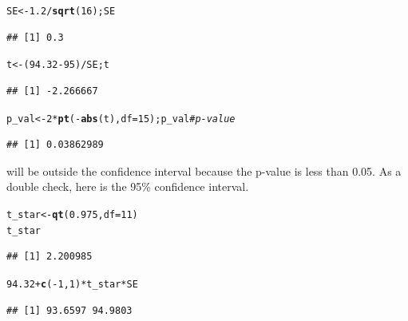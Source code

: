 \documentclass[twoside]{book}\usepackage[]{graphicx}\usepackage[]{xcolor}
\makeatletter
\newcommand{\hlnum}[1]{\textcolor[rgb]{0.686,0.059,0.569}{#1}}%
\newcommand{\hlcom}[1]{\textcolor[rgb]{0.678,0.584,0.686}{\textit{#1}}}%
\newcommand{\hlopt}[1]{\textcolor[rgb]{0,0,0}{#1}}%
\newcommand{\hlstd}[1]{\textcolor[rgb]{0.345,0.345,0.345}{#1}}%
\newcommand{\hlkwb}[1]{\textcolor[rgb]{0.69,0.353,0.396}{#1}}%
\newcommand{\hlkwc}[1]{\textcolor[rgb]{0.333,0.667,0.333}{#1}}%
\newcommand{\hlkwd}[1]{\textcolor[rgb]{0.737,0.353,0.396}{\textbf{#1}}}%
\newenvironment{kframe}{%
 \def\at@end@of@kframe{}%
 \ifinner\ifhmode%
  \def\at@end@of@kframe{\end{minipage}}%
  \begin{minipage}{\columnwidth}%
 \fi\fi%
 \def\FrameCommand##1{\hskip\@totalleftmargin \hskip-\fboxsep
 \colorbox{shadecolor}{##1}\hskip-\fboxsep
     \hskip-\linewidth \hskip-\@totalleftmargin \hskip\columnwidth}%
 \MakeFramed {\advance\hsize-\width
   \@totalleftmargin\z@ \linewidth\hsize
   \@setminipage}}%
 {\par\unskip\endMakeFramed%
 \at@end@of@kframe}
\newenvironment{knitrout}{}{} %
\makeatother
\begin{document}
\begin{solution}
\begin{knitrout}
\color{fgcolor}\begin{kframe}
\begin{alltt}
\hlstd{SE} \hlkwb{<-} \hlnum{1.2} \hlopt{/} \hlkwd{sqrt}\hlstd{(}\hlnum{16}\hlstd{); SE}
\end{alltt}
\begin{verbatim}
## [1] 0.3
\end{verbatim}
\begin{alltt}
\hlstd{t} \hlkwb{<-} \hlstd{(}\hlnum{94.32} \hlopt{-} \hlnum{95}\hlstd{)} \hlopt{/} \hlstd{SE; t}
\end{alltt}
\begin{verbatim}
## [1] -2.266667
\end{verbatim}
\begin{alltt}
\hlstd{p_val} \hlkwb{<-} \hlnum{2} \hlopt{*} \hlkwd{pt}\hlstd{(} \hlopt{-} \hlkwd{abs}\hlstd{(t),} \hlkwc{df}\hlstd{=}\hlnum{15} \hlstd{); p_val}    \hlcom{# p-value}
\end{alltt}
\begin{verbatim}
## [1] 0.03862989
\end{verbatim}
\end{kframe}
\end{knitrout}
	95 will be 
	outside 
	the confidence interval because the p-value is 
	less than 0.05. 
	As a double check, here is the 95\% confidence interval.
\begin{knitrout}
\color{fgcolor}\begin{kframe}
\begin{alltt}
\hlstd{t_star} \hlkwb{<-} \hlkwd{qt}\hlstd{(}\hlnum{0.975}\hlstd{,} \hlkwc{df} \hlstd{=} \hlnum{11}\hlstd{)}
\hlstd{t_star}
\end{alltt}
\begin{verbatim}
## [1] 2.200985
\end{verbatim}
\begin{alltt}
\hlnum{94.32} \hlopt{+} \hlkwd{c}\hlstd{(}\hlopt{-}\hlnum{1}\hlstd{,} \hlnum{1}\hlstd{)} \hlopt{*} \hlstd{t_star} \hlopt{*} \hlstd{SE}
\end{alltt}
\begin{verbatim}
## [1] 93.6597 94.9803
\end{verbatim}
\end{kframe}
\end{knitrout}
\end{solution}
\end{document}
